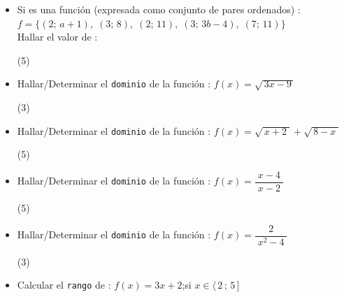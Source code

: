 \documentclass[11pt, twocolumn, landscape, a4paper]{article}
\begin{document}
\begin{itemize}
{
}
\item{Si  es una función (expresada como conjunto de pares ordenados) : \\ $f = \Big\{(2;\,a + 1),\;(3;\,8),\;(2;\,11),\;(3;\,3b - 4),\;(7;\,11) \Big\}$ \\ 
Hallar el valor de :\quad{}
\begin{tasks}(5)
\end{tasks}
}
\item{Hallar/Determinar el {\tt dominio} de la función : $f(x) = \sqrt{\,3x-9\,}$
\begin{tasks}(3) 
\task{$[\,9\,;\,\infty\,\rangle$}
\end{tasks}
}
\item{Hallar/Determinar el {\tt dominio} de la función : $f(x) = \sqrt{\,x + 2\;} + \sqrt{\,8 - x\;}$
\begin{tasks}(5) 
\task{$\big[\,2\,;\,8\,\big]$}
\end{tasks}
}
\item{Hallar/Determinar el {\tt dominio} de la función : $f(x) = \dfrac{x - 4}{\;x - 2\;}$
\begin{tasks}(5)
\task{$[\,2\,;\,4\,]$} 
\task{$\langle\,2\,;\,4\,]$} 
\end{tasks}
}
\item{Hallar/Determinar el {\tt dominio} de la función : $f(x) = \dfrac{2}{\;x^{2} - 4\;}$
\begin{tasks}(3) 
\end{tasks}
}
\item{Calcular el {\tt rango} de : $f(x) = 3x + 2$;\quad si $x \in \big\langle\,2\,;\,5\,\big]$
}
\end{itemize}
\end{document}
